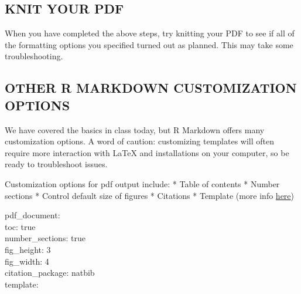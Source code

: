 \documentclass[
]{article}
\begin{document}
\hypertarget{knit-your-pdf}{%
\subsection{KNIT YOUR PDF}\label{knit-your-pdf}}

When you have completed the above steps, try knitting your PDF to see if
all of the formatting options you specified turned out as planned. This
may take some troubleshooting.

\hypertarget{other-r-markdown-customization-options}{%
\subsection{OTHER R MARKDOWN CUSTOMIZATION
OPTIONS}\label{other-r-markdown-customization-options}}

We have covered the basics in class today, but R Markdown offers many
customization options. A word of caution: customizing templates will
often require more interaction with LaTeX and installations on your
computer, so be ready to troubleshoot issues.

Customization options for pdf output include: * Table of contents *
Number sections * Control default size of figures * Citations * Template
(more info
\href{http://jianghao.wang/post/2017-12-08-rmarkdown-templates/}{here})

pdf\_document:\\
toc: true\\
number\_sections: true\\
fig\_height: 3\\
fig\_width: 4\\
citation\_package: natbib\\
template:
\end{document}
